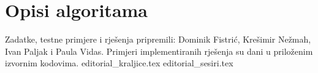 \documentclass[a4paper]{article}
\date{June 18th 2022}
\begin{document}
\section*{Opisi algoritama}
Zadatke, testne primjere i rješenja pripremili: Dominik Fistrić, Krešimir
Nežmah, Ivan Paljak i Paula Vidas.  Primjeri implementiranih rješenja su dani
u priloženim izvornim kodovima.
{editorial_kraljice.tex}
\clearpage
\clearpage
{editorial_sesiri.tex}
\end{document}
